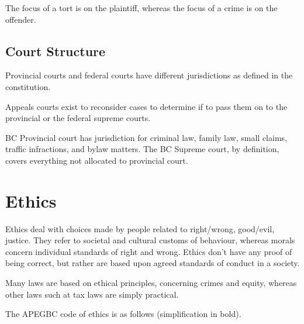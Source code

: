 \documentclass{article}
\begin{document}
The focus of a tort is on the plaintiff, whereas the focus of a crime is on the offender. 

\subsection{Court Structure}

Provincial courts and federal courts have different jurisdictions as defined in the constitution. 

Appeals courts exist to reconsider cases to determine if to pass them on to the provincial or the federal supreme courts.

BC Provincial court has jurisdiction for criminal law, family law, small claims, traffic infractions, and bylaw matters. The BC Supreme court, by definition, covers everything not allocated to provincial court. 

\section{Ethics}

Ethics deal with choices made by people related to right/wrong, good/evil, justice. They refer to societal and cultural customs of behaviour, whereas morals concern individual standards of right and wrong. Ethics don't have any proof of being correct, but rather are based upon agreed standards of conduct in a society.

Many laws are based on ethical principles, concerning crimes and equity, whereas other laws such at tax laws are simply practical. 

The APEGBC code of ethics is as follows (simplification in bold).
\end{document}
